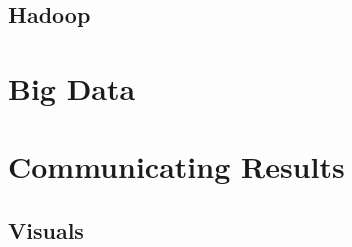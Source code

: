 \documentclass[10pt]{PhDthesisPSnPDF}%
\begin{document}
\section{Hadoop}
\chapter{Big Data}\label{bigData}
\chapter{Communicating Results}\label{Commun}
\section{Visuals}\label{Visuals}








%
%   
%
%
%
%
%
\end{document}

